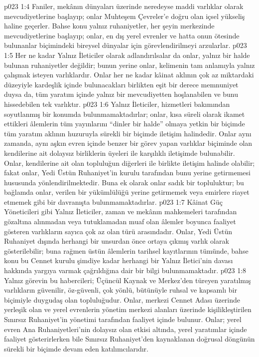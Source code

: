 \vs p023 1:4 Faniler, mekânın dünyaları üzerinde neredeyse maddi varlıklar olarak mevcudiyetlerine başlayıp; onlar Muhteşem Çevreler’e doğru olan içsel yükseliş haline geçerler. Bahse konu yalnız ruhaniyetler, her şeyin merkezinde mevcudiyetlerine başlayıp; onlar, en dış yerel evrenler ve hatta onun ötesinde bulunanlar biçimindeki bireysel dünyalar için görevlendirilmeyi arzularlar.
\vs p023 1:5 Her ne kadar Yalnız İleticiler olarak adlandırılsalar da onlar, yalnız bir halde bulunan ruhaniyetler değildir; bunun yerine onlar, kelimenin tam anlamıyla yalnız çalışmak isteyen varlıklardır. Onlar her ne kadar kâinat aklının çok az miktardaki düzeyiyle kardeşlik içinde bulunacakları birlikten eşit bir derece memnuniyet duysa da, tüm yaratım içinde yalnız bir mevcudiyetten hoşlanabilen ve bunu hissedebilen tek varlıktır.
\vs p023 1:6 Yalnız İleticiler, hizmetleri bakımından soyutlanmış bir konumda bulunmamaktadırlar; onlar, kısa süreli olarak ikamet ettikleri âlemlerin tüm yayınlarını “dinler bir halde” olmaya yetkin bir biçimde tüm yaratım aklının huzuruyla sürekli bir biçimde iletişim halindedir. Onlar aynı zamanda, aynı aşkın evren içinde benzer bir görev yapan varlıklar biçiminde olan kendilerine ait dolaysız birliklerin üyeleri ile karşılıklı iletişimde bulunabilir. Onlar, kendilerine ait olan topluluğun diğerleri ile birlikte iletişim halinde olabilir; fakat onlar, Yedi Üstün Ruhaniyet’in kurulu tarafından bunu yerine getirmemesi hususunda yönlendirilmektedir. Buna ek olarak onlar sadık bir topluluktur; bu bağlamda onlar, verilen bir yükümlülüğü yerine getirmemek veya emirlere riayet etmemek gibi bir davranışta bulunmamaktadırlar.
\vs p023 1:7 Kâinat Güç Yöneticileri gibi Yalnız İleticiler, zaman ve mekânın mahkemeleri tarafından gözaltına alınmadan veya tutuklamadan muaf olan âlemler boyunca faaliyet gösteren varlıkların sayıca çok az olan türü arasındadır. Onlar, Yedi Üstün Ruhaniyet dışında herhangi bir unsurdan önce ortaya çıkmış varlık olarak gösterilebilir; buna rağmen üstün âlemlerin tarihsel kayıtlarının tümünde, bahse konu bu Cennet kurulu şimdiye kadar herhangi bir Yalnız İletici’nin davası hakkında yargıya varmak çağrıldığına dair bir bilgi bulunmamaktadır.
\vs p023 1:8 Yalnız görevin bu habercileri; Üçüncül Kaynak ve Merkez’den türeyen yaratılmış varlıkların güvenilir, öz\hyp{}güvenli, çok yönlü, bütünüyle ruhsal ve kapsamlı bir biçimiyle duygudaş olan topluluğudur. Onlar, merkezi Cennet Adası üzerinde yerleşik olan ve yerel evrenlerin yönetim merkezi alanları üzerinde kişilikleştirilen Sınırsız Ruhaniyet’in yönetimi tarafından faaliyet içinde bulunur. Onlar; yerel evren Ana Ruhaniyetleri’nin dolaysız olan etkisi altında, yerel yaratımlar içinde faaliyet gösterirlerken bile Sınırsız Ruhaniyet’den kaynaklanan doğrusal döngünün sürekli bir biçimde devam eden katılımcılarıdır.
